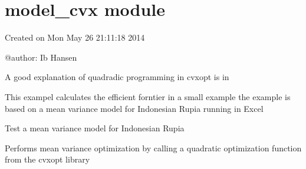 \documentclass[letterpaper,10pt,english]{sphinxmanual}
\begin{document}
\sphinxstepscope


\section{model\_cvx module}
\label{\detokenize{used/model_cvx:module-model_cvx}}\label{\detokenize{used/model_cvx:model-cvx-module}}\label{\detokenize{used/model_cvx::doc}}
\sphinxAtStartPar
Created on Mon May 26 21:11:18 2014

\sphinxAtStartPar
@author: Ib Hansen

\sphinxAtStartPar
A good explanation of quadradic programming in cvxopt is in

\sphinxAtStartPar
This exampel calculates the efficient forntier in a small example
the example is based on a mean variance model for Indonesian Rupia running in Excel

\begin{fulllineitems}
\label{\detokenize{used/model_cvx:model_cvx.MV_test}}
\pysigstartsignatures
{}
\pysigstopsignatures
\sphinxAtStartPar
Test a mean variance model for Indonesian Rupia

\end{fulllineitems}


\begin{fulllineitems}
\label{\detokenize{used/model_cvx:model_cvx.mv_opt}}
\pysigstartsignatures
{}
\pysigstopsignatures
\sphinxAtStartPar
Performs mean variance optimization by calling a
quadratic optimization function from the cvxopt
library

\end{fulllineitems}
\end{document}
